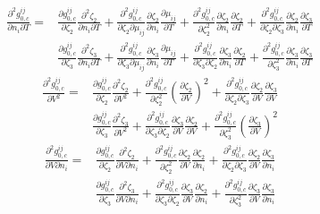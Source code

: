 \documentclass[english]{../thermomemo/thermomemo}
\newcommand{\z}{\zeta}
\begin{document}
\begin{equation}
\begin{split}
\frac{\partial^2 g_{0,c}^{ij}}{\partial n_i\partial T}=&\frac{\partial g_{0,c}^{ij}}{\partial \z_{2}}\frac{\partial^2 \z_{2}}{\partial n_i\partial T}+\frac{\partial^2 g_{0,c}^{ij}}{\partial \z_{2}\partial \mu_{ij}}\frac{\partial \z_{2}}{\partial n_i}\frac{\partial \mu_{ij}}{\partial T}+\frac{\partial^2 g_{0,c}^{ij}}{\partial \z_{2}^2}\frac{\partial \z_{2}}{\partial n_i}\frac{\partial \z_{2}}{\partial T}+\frac{\partial^2 g_{0,c}^{ij}}{\partial \z_{2}\partial \z_3}\frac{\partial \z_{2}}{\partial n_i}\frac{\partial \z_{3}}{\partial T} \\
&\frac{\partial g_{0,c}^{ij}}{\partial \z_{3}}\frac{\partial^2 \z_{3}}{\partial n_i\partial T}+\frac{\partial^2 g_{0,c}^{ij}}{\partial \z_{3}\partial\mu_{ij}}\frac{\partial \z_{3}}{\partial n_i}\frac{\partial \mu_{ij}}{\partial T} +\frac{\partial^2 g_{0,c}^{ij}}{\partial \z_{3}\partial \z_2}\frac{\partial \z_{3}}{\partial n_i}\frac{\partial \z_{2}}{\partial T} +\frac{\partial^2 g_{0,c}^{ij}}{\partial \z_{3}^2}\frac{\partial \z_{3}}{\partial n_i}\frac{\partial \z_{3}}{\partial T}  
\end{split}
\end{equation}
\begin{equation}
\begin{split}
\frac{\partial^2 g_{0,c}^{ij}}{\partial V^2}=&\frac{\partial g_{0,c}^{ij}}{\partial \z_{2}}\frac{\partial^2 \z_{2}}{\partial V^2}+\frac{\partial^2 g_{0,c}^{ij}}{\partial \z_{2}^2}\left(\frac{\partial \z_{2}}{\partial V}\right)^2+\frac{\partial^2 g_{0,c}^{ij}}{\partial \z_{2}\partial \z_3}\frac{\partial \z_{2}}{\partial V}\frac{\partial \z_{3}}{\partial V}\\
&\frac{\partial g_{0,c}^{ij}}{\partial \z_{3}}\frac{\partial^2 \z_{3}}{\partial V^2} +\frac{\partial^2 g_{0,c}^{ij}}{\partial \z_{3}\partial \z_{2}}\frac{\partial \z_{3}}{\partial V}\frac{\partial \z_{2}}{\partial V}+\frac{\partial^2 g_{0,c}^{ij}}{\partial \z_{3}^2}\left(\frac{\partial \z_{3}}{\partial V}\right)^2
\end{split}
\end{equation}
\begin{equation}
\begin{split}
\frac{\partial^2 g_{0,c}^{ij}}{\partial V\partial n_i}=&\frac{\partial g_{0,c}^{ij}}{\partial \z_{2}}\frac{\partial^2 \z_{2}}{\partial V\partial n_i}+\frac{\partial^2 g_{0,c}^{ij}}{\partial \z_{2}^2}\frac{\partial \z_{2}}{\partial V}\frac{\partial \z_{2}}{\partial n_i}+\frac{\partial^2 g_{0,c}^{ij}}{\partial \z_{2}\partial \z_3}\frac{\partial \z_{2}}{\partial V}\frac{\partial \z_{3}}{\partial n_i} \\
&\frac{\partial g_{0,c}^{ij}}{\partial \z_{3}}\frac{\partial^2 \z_{3}}{\partial V\partial n_i}+\frac{\partial^2 g_{0,c}^{ij}}{\partial \z_{3}\partial \z_2}\frac{\partial \z_{3}}{\partial V}\frac{\partial \z_{2}}{\partial n_i} +\frac{\partial^2 g_{0,c}^{ij}}{\partial \z_{3}^2}\frac{\partial \z_{3}}{\partial V}\frac{\partial \z_{3}}{\partial n_i}  
\end{split}
\end{equation}
\end{document}
